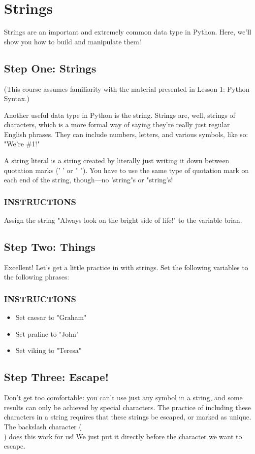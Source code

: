 \documentclass[12pt,a4paper,final,twoside,onecolumn,titlepage]{book}
\begin{document}
\section{Strings}
Strings are an important and extremely common data type in Python. Here, we'll show you how to build and manipulate them!

\subsection{Step One: Strings}
(This course assumes familiarity with the material presented in Lesson 1: Python Syntax.)

Another useful data type in Python is the string. Strings are, well, strings of characters, which is a more formal way of saying they're really just regular English phrases. They can include numbers, letters, and various symbols, like so: "We're \#1!"

A string literal is a string created by literally just writing it down between quotation marks (' ' or " "). You have to use the same type of quotation mark on each end of the string, though—no 'string"s or "string's!

\subsubsection{INSTRUCTIONS}
Assign the string "Always look on the bright side of life!" to the variable brian.

\subsection{Step Two: Things}
Excellent! Let's get a little practice in with strings. Set the following variables to the following phrases:

\subsubsection{INSTRUCTIONS}
\begin{itemize}
\item Set caesar to "Graham"
\item Set praline to "John"
\item Set viking to "Teresa"
\end{itemize}

\subsection{Step Three: Escape!}
Don't get too comfortable: you can't use just any symbol in a string, and some results can only be achieved by special characters. The practice of including these characters in a string requires that these strings be escaped, or marked as unique. The backslash character (\\) does this work for us! We just put it directly before the character we want to escape.
\end{document}
